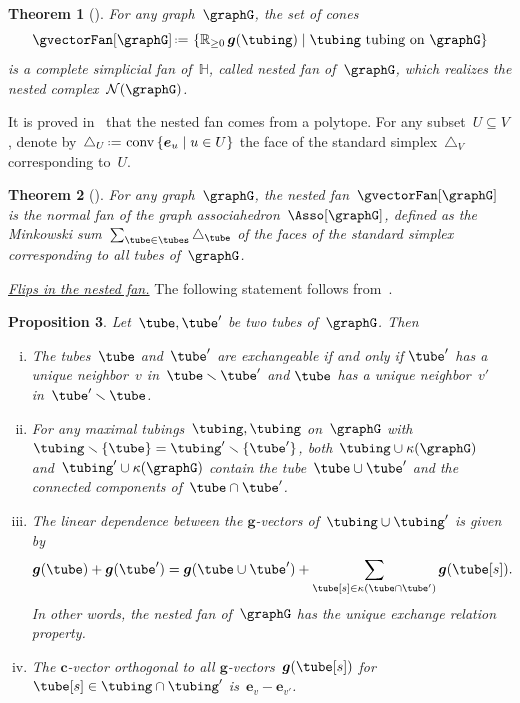 \documentclass{amsart}
\newtheorem{theorem}{Theorem}[section]
\newtheorem{proposition}[theorem]{Proposition}
\theoremstyle{definition}
\newcommand{\R}{\mathbb{R}} %
\newcommand{\HH}{\mathbb{H}} %
\renewcommand{\b}[1]{{\boldsymbol{#1}}} %
\newcommand{\set}[2]{\left\{ #1 \;\middle|\; #2 \right\}} %
\newcommand{\ssm}{\smallsetminus} %
\newcommand{\eqdef}{\mbox{\,\raisebox{0.2ex}{\scriptsize\ensuremath{\mathrm:}}\ensuremath{=}\,}} %
\DeclareMathOperator{\conv}{conv} %
\newcommand{\darkblue}{\color{darkblue}} %
\newcommand{\defn}[1]{\textsl{\darkblue #1}} %
\newcommand{\para}[1]{\medskip\noindent\uline{\textit{#1.}}} %
\newcommand{\gvector}[1]{\b{g}(#1)} %
\newcommand{\gvectors}[1]{\b{g}(#1)} %
\newcommand{\ground}{V} %
\newcommand{\connectedComponents}{\kappa} %
\newcommand{\nestedComplex}{\mathcal{N}} %
\begin{document}
\begin{theorem}[\cite{CarrDevadoss, Postnikov, FeichtnerSturmfels, Zelevinsky}]
\label{thm:nestedFan}
For any graph~$\graphG$, the set of cones
\[
\gvectorFan[\graphG] \eqdef \set{\R_{\ge 0} \, \gvectors{\tubing}}{\tubing \text{ tubing on } \graphG}
\]
is a complete simplicial fan of~$\HH$, called \defn{nested fan} of~$\graphG$, which realizes the nested complex~$\nestedComplex(\graphG)$.
\end{theorem}

It is proved in~\cite{CarrDevadoss, Devadoss, Postnikov, FeichtnerSturmfels, Zelevinsky} that the nested fan comes from a polytope.
For any subset~$U \subseteq \ground$, denote by~$\triangle_U \eqdef \conv\set{\b{e}_u}{u \in U}$ the face of the standard simplex~$\triangle_\ground$ corresponding to~$U$.

\begin{theorem}[\cite{CarrDevadoss, Devadoss, Postnikov, FeichtnerSturmfels, Zelevinsky}]
For any graph~$\graphG$, the nested fan~$\gvectorFan[\graphG]$ is the normal fan of the graph associahedron~$\Asso[\graphG]$, defined as the Minkowski sum~$\sum_{\tube \in \tubes} \triangle_{\tube}$ of the faces of the standard simplex corresponding to all tubes of~$\graphG$.
\end{theorem}

\para{Flips in the nested fan}
%
The following statement follows from~\cite{MannevillePilaud-compatibilityFans, Zelevinsky}.

\begin{proposition}
\label{prop:exchangeablePairsGA}
Let~$\tube, \tube'$ be two tubes of~$\graphG$. Then
\begin{enumerate}[(i)]
\item The tubes~$\tube$ and~$\tube'$ are exchangeable if and only if $\tube'$ has a unique neighbor~$v$ in~$\tube \ssm \tube'$ and $\tube$ has a unique neighbor~$v'$ in~$\tube' \ssm \tube$.
\item For any maximal tubings~$\tubing, \tubing$ on~$\graphG$ with $\tubing \ssm \{\tube\} = \tubing' \ssm \{\tube'\}$, both~$\tubing \cup \connectedComponents(\graphG)$ and~$\tubing' \cup \connectedComponents(\graphG)$ contain the tube~$\tube \cup \tube'$ and the connected components of~$\tube \cap \tube'$.
\item The linear dependence between the $\b{g}$-vectors of~$\tubing \cup \tubing'$ is given by
\[
\gvector{\tube} + \gvector{\tube'} = \gvector{\tube \cup \tube'} + \sum_{\tube[s] \in \connectedComponents(\tube \cap \tube')} \gvector{\tube[s]}.
\]
In other words, the nested fan of~$\graphG$ has the unique exchange relation property.
\item The $\b{c}$-vector orthogonal to all $\b{g}$-vectors~$\gvector{\tube[s]}$ for~$\tube[s] \in \tubing \cap \tubing'$ is~$\b{e}_v - \b{e}_{v'}$.
\end{enumerate}
\end{proposition}
\end{document}

